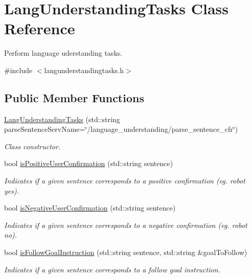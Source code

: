 \hypertarget{class_lang_understanding_tasks}{}\section{Lang\+Understanding\+Tasks Class Reference}
\label{class_lang_understanding_tasks}


Perform language uderstanding tasks.  




{\ttfamily \#include $<$langunderstandingtasks.\+h$>$}

\subsection*{Public Member Functions}
\begin{DoxyCompactItemize}
\item 
\hyperlink{class_lang_understanding_tasks_a86d3be8bceae7397f42d98d790d5f3ef}{Lang\+Understanding\+Tasks} (std\+::string parse\+Sentence\+Serv\+Name=\char`\"{}/language\+\_\+understanding/parse\+\_\+sentence\+\_\+cfr\char`\"{})
\begin{DoxyCompactList}\small\item\em Class constructor. \end{DoxyCompactList}\item 
bool \hyperlink{class_lang_understanding_tasks_a03615696fc2e78b620edc48fea4b3362}{is\+Positive\+User\+Confirmation} (std\+::string sentence)
\begin{DoxyCompactList}\small\item\em Indicates if a given sentence corresponds to a positive confirmation (eg. robot yes). \end{DoxyCompactList}\item 
bool \hyperlink{class_lang_understanding_tasks_a9b99f278d0d726f25756267518713b6f}{is\+Negative\+User\+Confirmation} (std\+::string sentence)
\begin{DoxyCompactList}\small\item\em Indicates if a given sentence corresponds to a negative confirmation (eg. robot no). \end{DoxyCompactList}\item 
bool \hyperlink{class_lang_understanding_tasks_a54c9a8ad3bd20938bce720b86711198f}{is\+Follow\+Goal\+Instruction} (std\+::string sentence, std\+::string \&goal\+To\+Follow)
\begin{DoxyCompactList}\small\item\em Indicates if a given sentence corresponds to a follow goal instruction. \end{DoxyCompactList}\item 

\end{DoxyCompactItemize}
